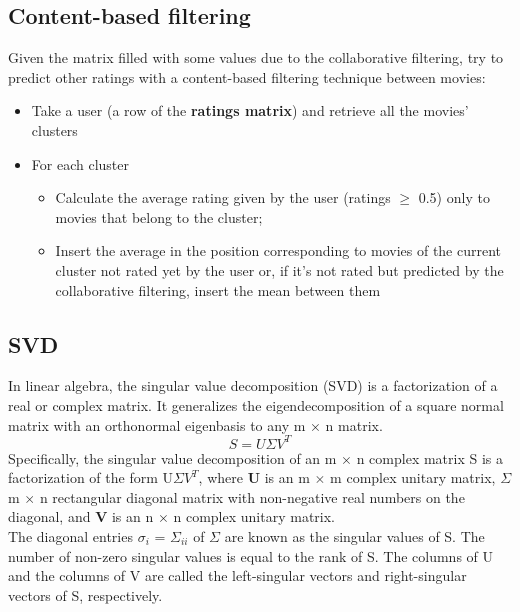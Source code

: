 \documentclass{article}
\begin{document}
\subsection{Content-based filtering}
Given the matrix filled with some values due to the collaborative filtering, try to predict other ratings with a content-based filtering technique between movies:
\begin{itemize}
    \item Take a user (a row of the \textbf{ratings matrix}) and retrieve all the movies' clusters
    \item For each cluster
    \begin{itemize}
          \item Calculate the average rating given by the user (ratings $\ge$ 0.5) only to movies that belong to the cluster;
          \item Insert the average in the position corresponding to movies of the current cluster not rated yet by the user or, if it's not rated but predicted by the collaborative filtering, insert the mean between them
    \end{itemize}
\end{itemize}


\subsection{SVD}
In linear algebra, the singular value decomposition (SVD) is a factorization of a real or complex matrix. It generalizes the eigendecomposition of a square normal matrix with an orthonormal eigenbasis to any m × n matrix.
\begin{equation}
      S = U\Sigma V^T
\end{equation}
Specifically, the singular value decomposition of an m $\times$ n complex matrix S is a factorization of the form U$\Sigma V^T$, where \textbf{U} is an m $\times$ m complex unitary matrix, \textbf{$\Sigma$} m $\times$ n rectangular diagonal matrix with non-negative real numbers on the diagonal, and \textbf{V} is an n $\times$ n complex unitary matrix.\\
The diagonal entries $\sigma _{i}$ = $\Sigma _{ii}$ of $\Sigma$ are known as the singular values of S. The number of non-zero singular values is equal to the rank of S. The columns of U and the columns of V are called the left-singular vectors and right-singular vectors of S, respectively.\\
\end{document}
